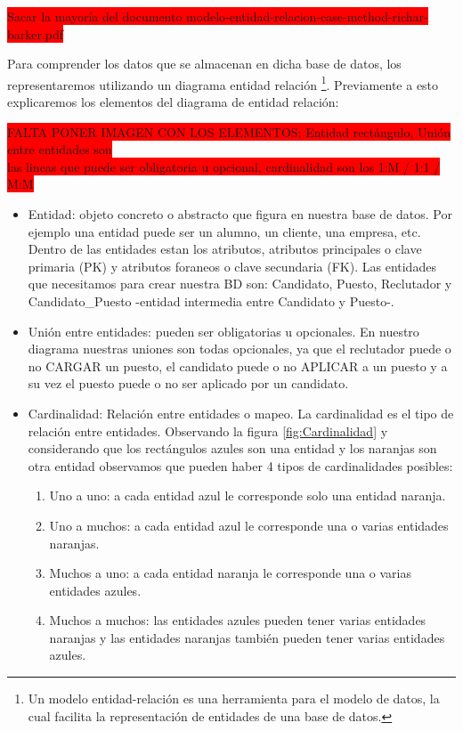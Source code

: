 \documentclass[12pt,a4paper]{article}
\begin{document}
\begin{sloppypar}
\colorbox{red}{Sacar la mayoría del documento modelo-entidad-relacion-case-method-richar-barker.pdf} 

Para comprender los datos que se almacenan en dicha base de datos, los representaremos utilizando un diagrama entidad relación \footnote{Un modelo entidad-relación es una herramienta para el modelo de datos, la cual facilita la representación de entidades de una base de datos.}.
Previamente a esto explicaremos los elementos del diagrama de entidad relación: 

\colorbox{red}{FALTA PONER IMAGEN CON LOS ELEMENTOS: Entidad rectángulo, Unión entre entidades son} \\ \colorbox{red}{las lineas que puede ser obligatoria u opcional, cardinalidad son los 1:M / 1:1 / M:M}

\begin{itemize}
\item Entidad: objeto concreto o abstracto que figura en nuestra base de datos. Por ejemplo una entidad puede ser un alumno, un cliente, una empresa, etc. Dentro de las entidades estan los atributos, atributos principales o clave primaria (PK) y atributos foraneos o clave secundaria (FK).  Las entidades que necesitamos para crear nuestra BD son: Candidato, Puesto, Reclutador y Candidato\_Puesto -entidad intermedia entre Candidato y Puesto-.
\item Unión entre entidades: pueden ser obligatorias u opcionales. En nuestro diagrama nuestras uniones son todas opcionales, ya que el reclutador puede o no CARGAR un puesto, el candidato puede o no APLICAR a un puesto y a su vez el puesto puede o no ser aplicado por un candidato. 
\item Cardinalidad: Relación entre entidades o mapeo. La cardinalidad es el tipo de relación entre entidades. Observando la figura \ref{fig:Cardinalidad} y considerando que los rectángulos azules son una entidad y los naranjas son otra entidad observamos que pueden haber 4 tipos de cardinalidades posibles:

\begin{enumerate}
\item Uno a uno: a cada entidad azul le corresponde solo una entidad naranja.
\item Uno a muchos: a cada entidad azul le corresponde una o varias entidades naranjas.
\item Muchos a uno: a cada entidad naranja le corresponde una o varias entidades azules.
\item Muchos a muchos: las entidades azules pueden tener varias entidades naranjas y las entidades naranjas también pueden tener varias entidades azules.
\end{enumerate}
\end{itemize}


\end{sloppypar}
\end{document}
